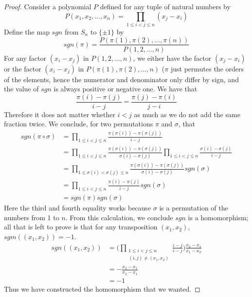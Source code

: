 \begin{proof}
    Consider a polynomial $P$ defined for any tuple of natural numbers by
    \[ P(x_1, x_2, \dots, x_n) = \prod_{1 \leq i < j \leq n} (x_j - x_i) \]
    Define the map $sgn$ from $S_n$ to $\{ \pm 1 \}$ by
    \[ sgn(\pi) = \frac{P(\pi(1), \pi(2), \dots, \pi(n))}{P(1,2, \dots, n)} \]
    For any factor $(x_i - x_j)$ in $P(1, 2, \dots, n)$, we either have the factor $(x_j - x_i)$ or the factor $(x_i - x_j)$ in $P(\pi(1), \pi(2), \dots, n)$ ($\pi$ just permutes the orders of the elements, hence the numerator and denominator only differ by sign, and the value of $sgn$ is always positive or negative one. We have that
    \[ \frac{\pi(i) - \pi(j)}{i - j} = \frac{\pi(j) - \pi(i)}{j - i} \]
    Therefore it does not matter whether $i < j$ as much as we do not add the same fraction twice. We conclude, for two permutations $\pi$ and $\sigma$, that
    \begin{align*}
        sgn(\pi \circ \sigma) &= \prod_{1 \leq i < j \leq n} \frac{\pi(\sigma(i)) - \pi(\sigma(j))}{i - j}\\
        &= \prod_{1 \leq i < j \leq n} \frac{\pi(\sigma(i)) - \pi(\sigma(j))}{\sigma(i) - \sigma(j)} \prod_{1 \leq i < j \leq n} \frac{\sigma(i) - \sigma(j)}{i - j}\\
        &= \prod_{1 \leq \sigma(i) < \sigma(j) \leq n} \frac{\pi(\sigma(i)) - \pi(\sigma(j))}{\sigma(i) - \sigma(j)} sgn(\sigma)\\
        &= \prod_{1 \leq i < j \leq n} \frac{\pi(i) - \pi(j)}{i - j} sgn(\sigma)\\
        &= sgn(\pi) sgn(\sigma)
    \end{align*}
    Here the third and fourth equality works because $\sigma$ is a permutation of the numbers from 1 to $n$. From this calculation, we conclude $sgn$ is a homomorphism; all that is left to prove is that for any transposition $(x_1, x_2)$, $sgm((x_1, x_2)) = -1$.
    \begin{align*}
        sgn((x_1, x_2)) &= \Bigg( \prod_{\substack{1 \leq i < j \leq n\\(i,j) \neq (x_1, x_2)}} \frac{i - j}{i - j} \Bigg) \frac{x_2 - x_1}{x_1 - x_2}\\
        &= - \frac{x_2 - x_1}{x_2 - x_1}\\
        &= -1
    \end{align*}
    Thus we have constructed the homomorphism that we wanted.
\end{proof}

